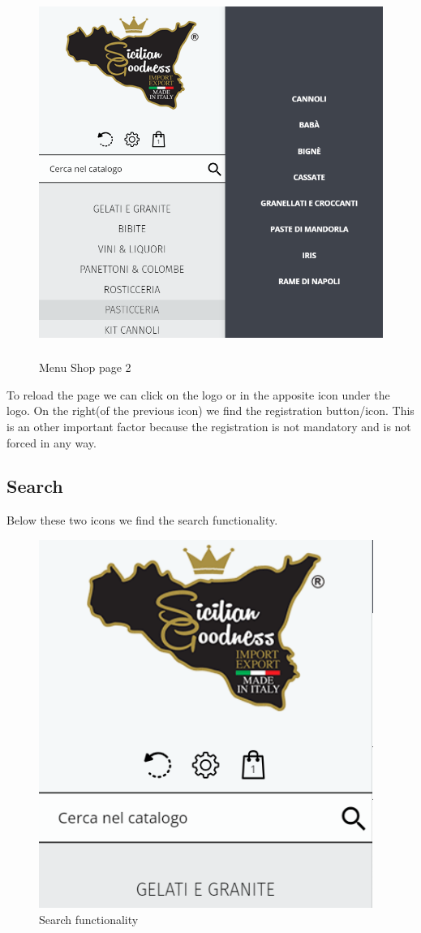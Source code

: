 \begin{figure}[H]
	\centering\includegraphics[height=12cm, width=12 cm]{Img/menushop2.png}
	\caption{Menu Shop page 2}
\end{figure}

To reload the page we can click on the logo or in the apposite icon under the logo.
On the right(of the previous icon) we find the registration button/icon. 
This is an other important factor because the registration is not mandatory and is not forced in any way.

\pagebreak

\subsection{Search}
Below these two icons we find the search functionality. 

\begin{figure}[H]
	\centering\includegraphics[height=12cm, width=10 cm]{Img/search.png}
	\caption{Search functionality}
\end{figure}

